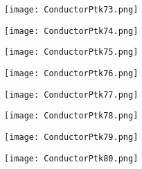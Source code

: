 \documentclass[pdf]{beamer}
\begin{document}
\begin{frame}
\begin{figure}[!h]
\centering
\texttt{[image: ConductorPtk73.png]}
\end{figure}
\end{frame}

\begin{frame}
\begin{figure}[!h]
\centering
\texttt{[image: ConductorPtk74.png]}
\end{figure}
\end{frame}

\begin{frame}
\begin{figure}[!h]
\centering
\texttt{[image: ConductorPtk75.png]}
\end{figure}
\end{frame}

\begin{frame}
\begin{figure}[!h]
\centering
\texttt{[image: ConductorPtk76.png]}
\end{figure}
\end{frame}

\begin{frame}
\begin{figure}[!h]
\centering
\texttt{[image: ConductorPtk77.png]}
\end{figure}
\end{frame}

\begin{frame}
\begin{figure}[!h]
\centering
\texttt{[image: ConductorPtk78.png]}
\end{figure}
\end{frame}

\begin{frame}
\begin{figure}[!h]
\centering
\texttt{[image: ConductorPtk79.png]}
\end{figure}
\end{frame}

\begin{frame}
\begin{figure}[!h]
\centering
\texttt{[image: ConductorPtk80.png]}
\end{figure}
\end{frame}
\end{document}
